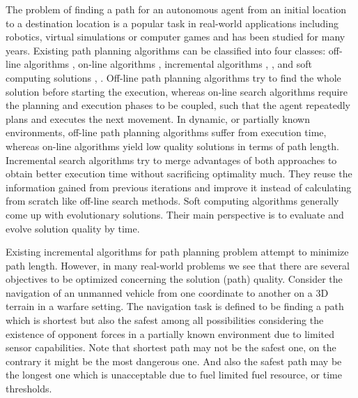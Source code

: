 \documentclass[10pt,journal]{IEEEtran}
\begin{document}
The problem of finding a path for an autonomous agent from an initial location to a destination location is a popular task in real-world applications including robotics, virtual simulations or computer games and has been studied for many years. Existing path planning algorithms can be classified into four classes: off-line algorithms \cite{Dijkstra:1959} \cite{AStarHart:1968}, on-line algorithms \cite{RTAStarKorf:1990}, incremental algorithms \cite{DStar:1994}, \cite{Koenig:2002}, \cite{FocussedDStarStentz:1995} and soft computing solutions \cite{Tarapata:2007}, \cite{Pangilinan}. Off-line path planning algorithms try to find the whole solution before starting the execution, whereas on-line search algorithms require the planning and execution phases to be coupled, such that the agent repeatedly plans and executes the next movement. In dynamic, or partially known environments, off-line path planning algorithms suffer from execution time, whereas on-line algorithms yield low quality solutions in terms of path length. Incremental search algorithms try to merge advantages of both approaches to obtain better execution time without sacrificing optimality much. They reuse the information gained from previous iterations and improve it instead of calculating from scratch like off-line search methods. Soft computing algorithms generally come up with evolutionary solutions. Their main perspective is to evaluate and evolve solution quality by time. 

Existing incremental algorithms for path planning problem attempt to minimize path length. However, in many real-world problems we see that there are several objectives to be optimized concerning the solution (path) quality. Consider the navigation of an unmanned vehicle from one coordinate to another on a 3D terrain in a warfare setting. The navigation task is defined to be finding a path which is shortest but also the safest among all possibilities considering the existence of opponent forces in a partially known environment due to limited sensor capabilities. Note that shortest path may not be the safest one, on the contrary it might be the most dangerous one. And also the safest path may be the longest one which is unacceptable due to fuel limited fuel resource, or time thresholds. 
\end{document}
